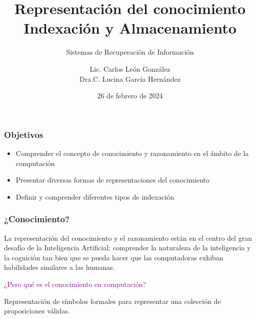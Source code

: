 \documentclass[
10pt, %
aspectratio=169, %
]{beamer}
\title[Short Title]{Representación del conocimiento \\ Indexación y Almacenamiento}
\subtitle{Sistemas de Recuperación de Información}
\author{Lic. Carlos León González \\ Dra.C. Lucina García Hernández}
\institute[UC]{Facultad de Matem\'atica y Computaci\'on \\ Universidad de La Habana \\ \smallskip }
\date{26 de febrero de  2024} %
\begin{document}
	
	
	
	\begin{frame}
		\titlepage
	\end{frame}
	
	\begin{frame}
		
		\frametitle{Objetivos}
		
		\begin{itemize}

			\item Comprender el concepto de conocimiento y razonamiento en el ámbito de la computación
			
			\item Presentar diversas formas de representaciones del conocimiento
			
			\item Definir y comprender diferentes tipos de indexación
						
		\end{itemize}
		
	\end{frame}
	
	\begin{frame}
		
		\frametitle{¿Conocimiento?}
		
		La representación del conocimiento y el razonamiento están en el centro del gran desafío de la Inteligencia Artificial: comprender la naturaleza de la inteligencia y la cognición tan bien que se pueda hacer que las computadoras exhiban habilidades similares a las humanas.
		
		\pause
		\vspace{2\baselineskip}
		\textcolor{purple}{¿Pero qué es el conocimiento en computación?}
		
		
		\pause
		\begin{alertblock}{}
			Representación de símbolos formales para representar una colección de proposiciones válidas.
		\end{alertblock}
		
	\end{frame}
	
\end{document}
